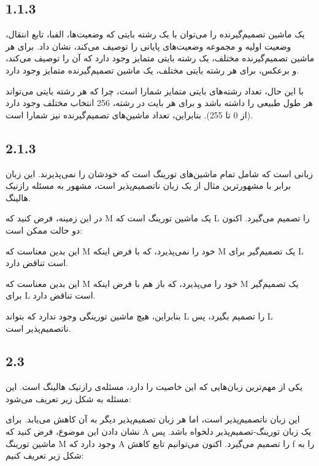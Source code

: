 \subsection*{1.1.3}

یک ماشین تصمیم‌گیرنده را می‌توان با یک رشته بایتی که وضعیت‌ها، الفبا، تابع انتقال، وضعیت اولیه و مجموعه وضعیت‌های پایانی را توصیف می‌کند، نشان داد. برای هر ماشین تصمیم‌گیرنده مختلف، یک رشته بایتی متمایز وجود دارد که آن را توصیف می‌کند، و برعکس، برای هر رشته بایتی مختلف، یک ماشین تصمیم‌گیرنده متمایز وجود دارد.

با این حال، تعداد رشته‌های بایتی متمایز شمارا است، چرا که هر رشته بایتی می‌تواند هر طول طبیعی را داشته باشد و برای هر بایت در رشته، 256 انتخاب مختلف وجود دارد (از 0 تا 255). بنابراین، تعداد ماشین‌های تصمیم‌گیرنده نیز شمارا است.

\subsection*{2.1.3}


 زبانی است که شامل تمام ماشین‌های تورینگ است که خودشان را نمی‌پذیرند. این زبان برابر با مشهورترین مثال از یک زبان ناتصمیم‌پذیر است، مشهور به مسئله رازنیک هالینگ.

در این زمینه، فرض کنید که M یک ماشین تورینگ است که L را تصمیم می‌گیرد. اکنون دو حالت ممکن است:



این بدین معناست که M خود را نمی‌پذیرد، که با فرض اینکه M یک تصمیم‌گیر برای L است تناقض دارد.



این بدین معناست که M خود را می‌پذیرد، که باز هم با فرض اینکه M یک تصمیم‌گیر برای L است تناقض دارد.

بنابراین، هیچ ماشین تورینگی وجود ندارد که بتواند L را تصمیم بگیرد، پس L ناتصمیم‌پذیر است.

\subsection*{2.3}

یکی از مهم‌ترین زبان‌هایی که این خاصیت را دارد، مسئله‌ی رازنیک هالینگ 
 است. این مسئله به شکل زیر تعریف می‌شود:


این زبان ناتصمیم‌پذیر است، اما هر زبان تصمیم‌پذیر دیگر به آن کاهش می‌یابد. برای نشان دادن این موضوع، فرض کنید که A یک زبان تورینگ-تصمیم‌پذیر دلخواه باشد. پس ماشین تورینگ M وجود دارد که A را تصمیم می‌گیرد. اکنون می‌توانیم تابع کاهش f را به شکل زیر تعریف کنیم:

